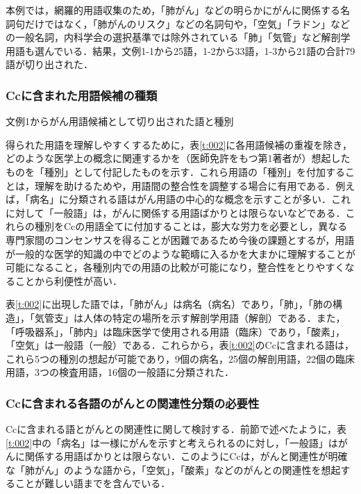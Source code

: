 \documentclass[japanese]{jnlp_1.4}
\begin{document}
本例では，網羅的用語収集のため，「肺がん」などの明らかにがんに関係する名詞句だけではなく，「肺がんのリスク」などの名詞句や，「空気」「ラドン」などの一般名詞，内科学会の選択基準では除外されている「肺」「気管」など解剖学用語も選んでいる．結果，文例1-1から25語，1-2から33語，1-3から21語の合計79語が切り出された．


\subsubsection{Ccに含まれた用語候補の種類}
\label{s:Ccに含まれた用語候補の種類}

\begin{table}[b]
 \caption{文例1からがん用語候補として切り出された語と種別}
 \begin{center}

 \end{center}
 \label{t:002}
\end{table}

得られた用語を理解しやすくするために，表\ref{t:002}に各用語候補の重複を除き，どのような医学上の概念に関連するかを（医師免許をもつ第1著者が）想起したものを「種別」として付記したものを示す．これら用語の「種別」を付加することは，理解を助けるためや，用語間の整合性を調整する場合に有用である．例えば，「病名」に分類される語はがん用語の中心的な概念を示すことが多い．これに対して「一般語」は，がんに関係する用語ばかりとは限らないなどである．これらの種別をCcの用語全てに付加することは，膨大な労力を必要とし，異なる専門家間のコンセンサスを得ることが困難であるため今後の課題とするが，用語が一般的な医学的知識の中でどのような範疇に入るかを大まかに理解することが可能になること，各種別内での用語の比較が可能になり，整合性をとりやすくなることから利便性が高い．

表\ref{t:002}に出現した語では，「肺がん」は病名（病名）であり，「肺」，「肺の構造」，「気管支」は人体の特定の場所を示す解剖学用語（解剖）である．また，「呼吸器系」，「肺内」は臨床医学で使用される用語（臨床）であり，「酸素」，「空気」は一般語（一般）である．これらから，表\ref{t:002}のCcに含まれる語は，これら5つの種別の想起が可能であり，9個の病名，25個の解剖用語，22個の臨床用語，3つの検査用語，16個の一般語に分類された．


\subsubsection{Ccに含まれる各語のがんとの関連性分類の必要性}
\label{s:Ccに含まれる各語のがんとの関連性分類の必要性}

Ccに含まれる語とがんとの関連性に関して検討する．前節で述べたように，表\ref{t:002}中の「病名」は一様にがんを示すと考えられるのに対し，「一般語」はがんに関係する用語ばかりとは限らない．このようにCcは，がんと関連性が明確な「肺がん」のような語から，「空気」，「酸素」などのがんとの関連性を想起することが難しい語までを含んでいる．
\end{document}
